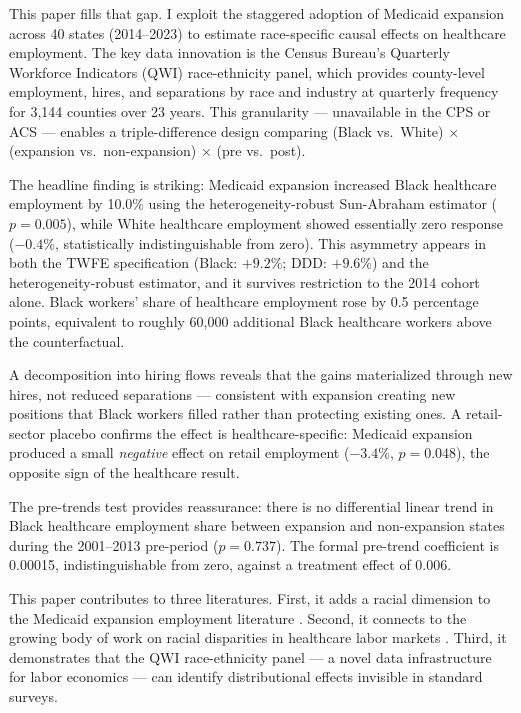 \documentclass[12pt]{article}
\begin{document}
This paper fills that gap. I exploit the staggered adoption of Medicaid expansion across 40 states (2014--2023) to estimate race-specific causal effects on healthcare employment. The key data innovation is the Census Bureau's Quarterly Workforce Indicators (QWI) race-ethnicity panel, which provides county-level employment, hires, and separations by race and industry at quarterly frequency for 3,144 counties over 23 years. This granularity --- unavailable in the CPS or ACS --- enables a triple-difference design comparing (Black vs.\ White) $\times$ (expansion vs.\ non-expansion) $\times$ (pre vs.\ post).

The headline finding is striking: Medicaid expansion increased Black healthcare employment by 10.0\% using the heterogeneity-robust Sun-Abraham estimator ($p = 0.005$), while White healthcare employment showed essentially zero response ($-0.4\%$, statistically indistinguishable from zero). This asymmetry appears in both the TWFE specification (Black: $+9.2\%$; DDD: $+9.6\%$) and the heterogeneity-robust estimator, and it survives restriction to the 2014 cohort alone. Black workers' share of healthcare employment rose by 0.5 percentage points, equivalent to roughly 60,000 additional Black healthcare workers above the counterfactual.

A decomposition into hiring flows reveals that the gains materialized through new hires, not reduced separations --- consistent with expansion creating new positions that Black workers filled rather than protecting existing ones. A retail-sector placebo confirms the effect is healthcare-specific: Medicaid expansion produced a small \textit{negative} effect on retail employment ($-3.4\%$, $p = 0.048$), the opposite sign of the healthcare result.

The pre-trends test provides reassurance: there is no differential linear trend in Black healthcare employment share between expansion and non-expansion states during the 2001--2013 pre-period ($p = 0.737$). The formal pre-trend coefficient is 0.00015, indistinguishable from zero, against a treatment effect of 0.006.

This paper contributes to three literatures. First, it adds a racial dimension to the Medicaid expansion employment literature \citep{kaestner2017effects, leung2020, duggan2019}. Second, it connects to the growing body of work on racial disparities in healthcare labor markets \citep{bucknor2016, cook2014}. Third, it demonstrates that the QWI race-ethnicity panel --- a novel data infrastructure for labor economics --- can identify distributional effects invisible in standard surveys.
\end{document}

